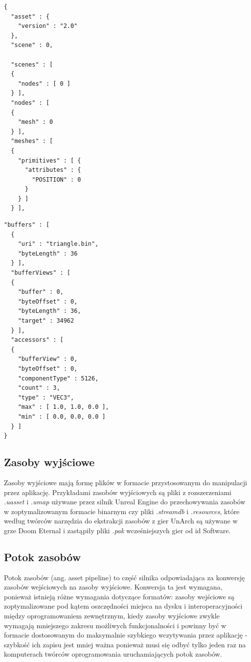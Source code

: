 \noindent\begin{minipage}{.35\textwidth}
\lstset{language=JSON}
\begin{lstlisting}
{
  "asset" : {
    "version" : "2.0"
  },
  "scene" : 0,
  
  "scenes" : [
  {
    "nodes" : [ 0 ]
  } ],
  "nodes" : [
  {
    "mesh" : 0
  } ],
  "meshes" : [
  {
    "primitives" : [ {
      "attributes" : {
        "POSITION" : 0
      }
    } ]
  } ],
\end{lstlisting}
\end{minipage}\hfill
\begin{minipage}{.55\textwidth}
\lstset{language=JSON}
\begin{lstlisting}[frame=l]
  "buffers" : [
  {
    "uri" : "triangle.bin",
    "byteLength" : 36
  } ],
  "bufferViews" : [
  {
    "buffer" : 0,
    "byteOffset" : 0,
    "byteLength" : 36,
    "target" : 34962
  } ],
  "accessors" : [
  {
    "bufferView" : 0,
    "byteOffset" : 0,
    "componentType" : 5126,
    "count" : 3,
    "type" : "VEC3",
    "max" : [ 1.0, 1.0, 0.0 ],
    "min" : [ 0.0, 0.0, 0.0 ]
  } ]
}
\end{lstlisting}
\end{minipage}

\subsection{Zasoby wyjściowe}

Zasoby wyjściowe mają formę plików w formacie przystosowanym do manipulacji przez aplikację. Przykładami zasobów wyjściowych są pliki z rozszerzeniami \textit{.uasset} i \textit{.umap} używane przez silnik Unreal Engine \cite{unrealengine} do przechowywania zasobów w zoptymalizowanym formacie binarnym czy pliki \textit{.streamdb} i \textit{.resources}, które według twórców narzędzia do ekstrakcji zasobów z gier UnArch \cite{UNARCH} są używane w grze Doom Eternal i zastąpiły pliki \textit{.pak} wcześniejszych gier od id Software.


\subsection{Potok zasobów}

Potok zasobów (ang. asset pipeline) to część silnika odpowiadająca za konwersję zasobów wejściowych na zasoby wyjściowe.
Konwersja ta jest wymagana, ponieważ istnieją różne wymagania dotyczące formatów: zasoby wejściowe są zoptymalizowane pod kątem oszczędności miejsca na dysku i interoperacyjności między oprogramowaniem zewnętrznym, kiedy zasoby wyjściowe zwykle wymagają mniejszego zakresu możliwych funkcjonalności i powinny być w formacie dostosowanym do maksymalnie szybkiego wczytywania przez aplikację - szybkość ich zapisu jest mniej ważna ponieważ musi się odbyć tylko jeden raz na komputerach twórców oprogramowania uruchamiających potok zasobów.

